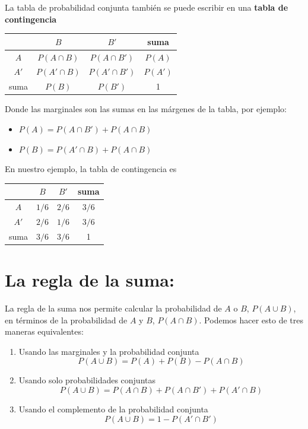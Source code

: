 \documentclass[
]{book}
\providecommand{\tightlist}{%
  \setlength{\itemsep}{0pt}\setlength{\parskip}{0pt}}
\begin{document}
La tabla de probabilidad conjunta también se puede escribir en una \textbf{tabla de contingencia}

\begin{longtable}[]{@{}cccc@{}}
\toprule\noalign{}
& \(B\) & \(B'\) & suma \\
\midrule\noalign{}
\endhead
\bottomrule\noalign{}
\endlastfoot
\(A\) & \(P(A \cap B )\) & \(P(A\cap B' )\) & \(P(A)\) \\
\(A'\) & \(P(A'\cap B )\) & \(P(A'\cap B' )\) & \(P(A')\) \\
suma & \(P(B)\) & \(P(B')\) & 1 \\
\end{longtable}

Donde las marginales son las sumas en las márgenes de la tabla, por ejemplo:

\begin{itemize}
\tightlist
\item
  \(P(A)=P(A \cap B') + P(A \cap B)\)
\item
  \(P(B)=P(A' \cap B) +P(A \cap B)\)
\end{itemize}

En nuestro ejemplo, la tabla de contingencia es

\begin{longtable}[]{@{}cccc@{}}
\toprule\noalign{}
& \(B\) & \(B'\) & suma \\
\midrule\noalign{}
\endhead
\bottomrule\noalign{}
\endlastfoot
\(A\) & \(1/6\) & \(2/6\) & \(3/6\) \\
\(A'\) & \(2/6\) & \(1/6\) & \(3/6\) \\
suma & \(3/6\) & \(3/6\) & 1 \\
\end{longtable}

\hypertarget{la-regla-de-la-suma}{%
\section{La regla de la suma:}\label{la-regla-de-la-suma}}

La regla de la suma nos permite calcular la probabilidad de \(A\) o \(B\), \(P(A \cup B)\), en términos de la probabilidad de \(A\) y \(B\), \(P(A \cap B)\). Podemos hacer esto de tres maneras equivalentes:

\begin{enumerate}
\def\labelenumi{\arabic{enumi})}
\item
  Usando las marginales y la probabilidad conjunta
  \[P(A \cup B)=P(A) + P(B) - P(A\cap B)\]
\item
  Usando solo probabilidades conjuntas
  \[P(A \cup B)=P(A \cap B)+P(A\cap B')+P(A'\cap B)\]
\item
  Usando el complemento de la probabilidad conjunta
  \[P(A \cup B)=1-P(A'\cap B')\]
\end{enumerate}
\end{document}
